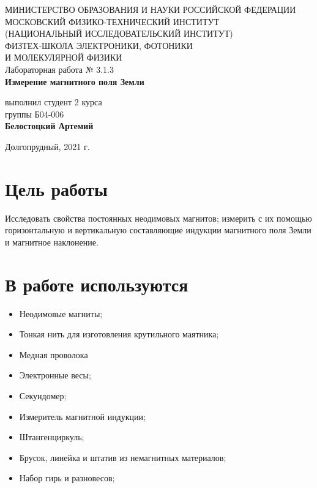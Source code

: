 \documentclass[a4paper,12pt]{article}
\begin{document}
 

\begin{titlepage}
	\begin{center}
		\large 	МИНИСТЕРСТВО ОБРАЗОВАНИЯ И НАУКИ РОССИЙСКОЙ ФЕДЕРАЦИИ\\
				МОСКОВСКИЙ ФИЗИКО-ТЕХНИЧЕСКИЙ ИНСТИТУТ \\
				(НАЦИОНАЛЬНЫЙ ИССЛЕДОВАТЕЛЬСКИЙ ИНСТИТУТ)\\ 
				ФИЗТЕХ-ШКОЛА ЭЛЕКТРОНИКИ, ФОТОНИКИ \\
				И МОЛЕКУЛЯРНОЙ ФИЗИКИ \\
		
		
		\vspace{4.0 cm}
		Лабораторная работа № 3.1.3 \\ 
		\LARGE \textbf{Измерение магнитного поля Земли}
	\end{center}
	\vspace{3 cm} \large
	
	\begin{flushright}
		выполнил студент 2 курса \\
		{группы Б04-006}\\
		\textbf{Белостоцкий Артемий}\\
	\end{flushright}
	
	\vfill

	\begin{center}
	Долгопрудный, 2021 г.
	\end{center}
\end{titlepage}                                                                      
 
\section{Цель работы}
Исследовать свойства постоянных неодимовых магнитов;
измерить с их помощью горизонтальную и вертикальную составляющие
индукции магнитного поля Земли и магнитное наклонение.


\section{В работе используются}
	\begin{itemize}
	\item Неодимовые магниты;
	\item Тонкая нить для изготовления крутильного маятника;
	\item Медная проволока
	\item Электронные весы;
	\item Секундомер;
	\item Измеритель магнитной индукции;
	\item Штангенциркуль;
	\item Брусок, линейка
и штатив из немагнитных материалов;
	\item Набор гирь и разновесов;
	\end{itemize}
\end{document}
